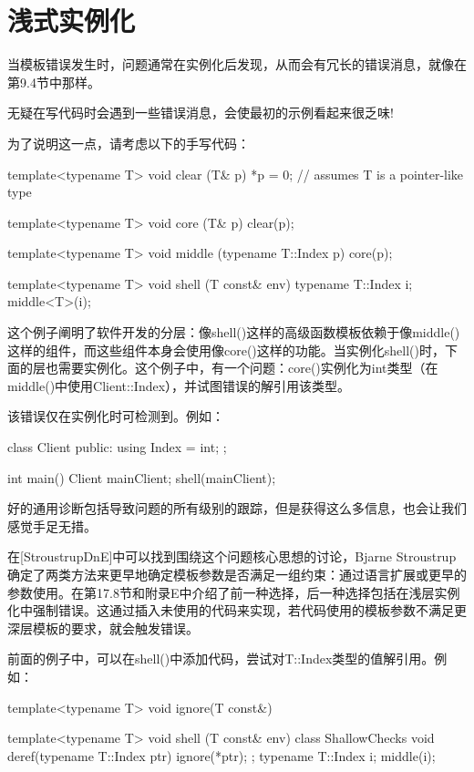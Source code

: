 \section{浅式实例化}
当模板错误发生时，问题通常在实例化后发现，从而会有冗长的错误消息，就像在第9.4节中那样。

\begin{notice}
无疑在写代码时会遇到一些错误消息，会使最初的示例看起来很乏味!
\end{notice}

为了说明这一点，请考虑以下的手写代码：

\begin{cpp}
template<typename T>
void clear (T& p)
{
	*p = 0; // assumes T is a pointer-like type
}

template<typename T>
void core (T& p)
{
	clear(p);
}

template<typename T>
void middle (typename T::Index p)
{
	core(p);
}

template<typename T>
void shell (T const& env)
{
	typename T::Index i;
	middle<T>(i);
}
\end{cpp}

这个例子阐明了软件开发的分层：像shell()这样的高级函数模板依赖于像middle()这样的组件，而这些组件本身会使用像core()这样的功能。当实例化shell()时，下面的层也需要实例化。这个例子中，有一个问题：core()实例化为int类型（在middle()中使用Client::Index），并试图错误的解引用该类型。

该错误仅在实例化时可检测到。例如：

\begin{cpp}
class Client
{
	public:
	using Index = int;
};

int main()
{
	Client mainClient;
	shell(mainClient);
}
\end{cpp}

好的通用诊断包括导致问题的所有级别的跟踪，但是获得这么多信息，也会让我们感觉手足无措。

在[StroustrupDnE]中可以找到围绕这个问题核心思想的讨论，Bjarne Stroustrup确定了两类方法来更早地确定模板参数是否满足一组约束：通过语言扩展或更早的参数使用。在第17.8节和附录E中介绍了前一种选择，后一种选择包括在浅层实例化中强制错误。这通过插入未使用的代码来实现，若代码使用的模板参数不满足更深层模板的要求，就会触发错误。

前面的例子中，可以在shell()中添加代码，尝试对T::Index类型的值解引用。例如：

\begin{cpp}
template<typename T>
void ignore(T const&)
{ }

template<typename T>
void shell (T const& env)
{
	class ShallowChecks
	{
		void deref(typename T::Index ptr) {
			ignore(*ptr);
		}
	};
	typename T::Index i;
	middle(i);
}
\end{cpp}

